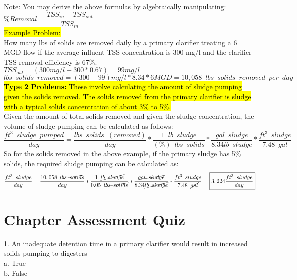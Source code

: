 Note:  You may derive the above formulas by algebraically manipulating: $\%Removal=\dfrac{TSS_{in} -TSS_{out}}{TSS_{in}}$\\
\hl{Example Problem:}\\
How many lbs of solids are removed daily by a primary clarifier treating a 6 MGD flow if the average influent TSS concentration is 300 mg/l and the clarifier TSS removal efficiency is 67\%.\\
$TSS_{out}=(300mg/l - 300*0.67)=99mg/l$\\
$lbs \enspace solids \enspace  removed = (300-99)mg/l*8.34*6MGD=\boxed{10,058 \enspace lbs \enspace solids \enspace removed \enspace per \enspace day}$\\
\vspace{0.5cm}
\hl{\textbf{Type 2 Problems:}  These involve calculating the amount of sludge pumping given the solids removed.  The solids removed from the primary clarifier is sludge with a typical solids concentration of about 3\% to 5\%.}\\
Given the amount of total solids removed and given the sludge concentration, the volume of sludge pumping can be calculated as follows:  $$\dfrac{ft^3\enspace sludge\enspace pumped}{ day}= \dfrac{lbs \enspace solids \enspace (removed)}{day} * \dfrac{1 \enspace lb \enspace sludge}{(\%)\enspace lbs \enspace solids}*\dfrac{gal \enspace sludge}{8.34lb \enspace sludge}*\dfrac{ft^3 \enspace sludge}{7.48 \enspace gal} $$
So for the solids removed in the above example, if the primary sludge has 5\% solids, the required sludge pumping can be calculated as:
$$\dfrac{ft^3\enspace sludge}{day}= \dfrac{10,058 \enspace \cancel{lbs \enspace solids}}{day} * \dfrac{1 \enspace \cancel{lb \enspace sludge}}{0.05\enspace \cancel{lbs \enspace solids}}*\dfrac{\cancel{gal \enspace sludge}}{8.34\cancel{lb \enspace sludge}}*\dfrac{ft^3 \enspace sludge}{7.48 \enspace \cancel{gal}}=\boxed{3,224\dfrac{ft^3 \enspace sludge}{day}} $$

\section{Chapter Assessment Quiz}

1. An inadequate detention time in a primary clarifier would result in increased solids pumping to digesters\\

a. True \\
b. False \\

